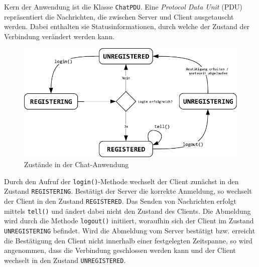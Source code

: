 \documentclass[11pt,a4paper,titlepage]{scrartcl}
\numberwithin{equation}{section}
\begin{document}
\noindent Kern der Anwendung ist die Klasse \texttt{ChatPDU}. Eine \textit{Protocol Data Unit} (PDU) repräsentiert die Nachrichten, die zwischen Server und Client ausgetauscht werden. Dabei enthalten sie Statusinformationen, durch welche der Zustand der Verbindung verändert werden kann. 
\medskip
\begin{figure}[ht] \label{fig:dakoZustand}
	\begin{center}
		\includegraphics[scale=1]{img/DaKoZustand.pdf}
		\caption{Zustände in der Chat-Anwendung}
	\end{center}
\end{figure}

\noindent Durch den Aufruf der \texttt{login()}-Methode wechselt der Client zunächst in den Zustand \texttt{REGISTERING}. Bestätigt der Server die korrekte Anmeldung, so wechselt der Client in den Zustand \texttt{REGISTERED}. Das Senden von Nachrichten erfolgt mittels \texttt{tell()} und ändert dabei nicht den Zustand des Clients. Die Abmeldung wird durch die Methode \texttt{logout()} initiiert, woraufhin sich der Client im Zustand \texttt{UNREGISTERING} befindet. Wird die Abmeldung vom Server bestätigt bzw. erreicht die Bestätigung den Client nicht innerhalb einer festgelegten Zeitspanne, so wird angenommen, dass die Verbindung geschlossen werden kann und der Client wechselt in den Zustand \texttt{UNREGISTERED}.\\
\end{document}
